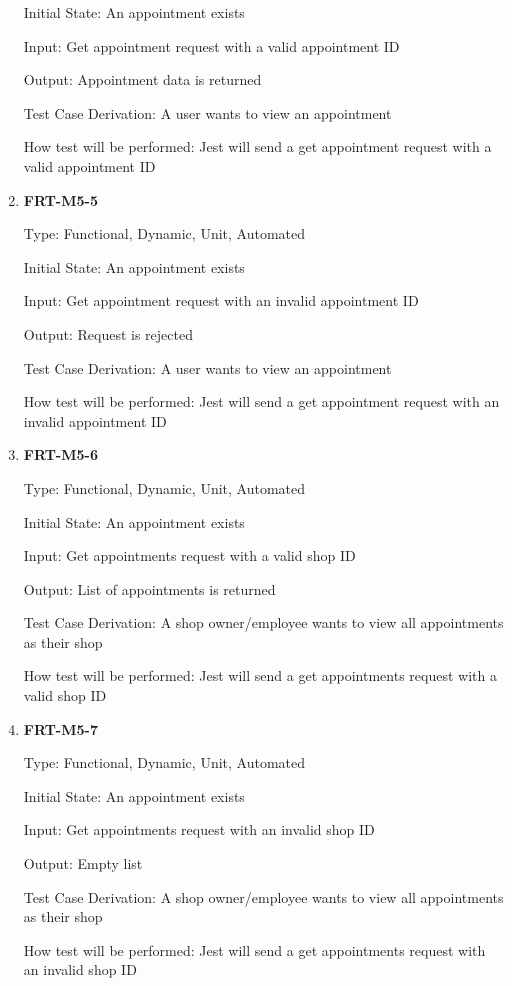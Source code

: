 \documentclass[12pt, titlepage]{article}
\begin{document}
\begin{enumerate}
	      Initial State: An appointment exists

	      Input: Get appointment request with a valid appointment ID

	      Output: Appointment data is returned

	      Test Case Derivation: A user wants to view an appointment

	      How test will be performed: Jest will send a get appointment request with a valid appointment ID

	\item \textbf{FRT-M5-5}

	      Type: Functional, Dynamic, Unit, Automated

	      Initial State: An appointment exists

	      Input: Get appointment request with an invalid appointment ID

	      Output: Request is rejected

	      Test Case Derivation: A user wants to view an appointment

	      How test will be performed: Jest will send a get appointment request with an invalid appointment ID

	\item \textbf{FRT-M5-6}

	      Type: Functional, Dynamic, Unit, Automated

	      Initial State: An appointment exists

	      Input: Get appointments request with a valid shop ID

	      Output: List of appointments is returned

	      Test Case Derivation: A shop owner/employee wants to view all appointments as their shop

	      How test will be performed: Jest will send a get appointments request with a valid shop ID

	\item \textbf{FRT-M5-7}

	      Type: Functional, Dynamic, Unit, Automated

	      Initial State: An appointment exists

	      Input: Get appointments request with an invalid shop ID

	      Output: Empty list

	      Test Case Derivation: A shop owner/employee wants to view all appointments as their shop

	      How test will be performed: Jest will send a get appointments request with an invalid shop ID


\end{enumerate}
\end{document}
